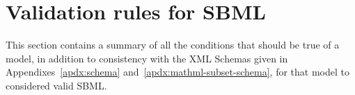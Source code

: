 
\newcommand{\sbmlrule}   [1]{\item[#1.]}

\section{Validation rules for SBML}
\label{apdx:validation-rules}

This section contains a summary of all the conditions that should
be true of a model, in addition to consistency with the XML
Schemas given in Appendixes~\ref{apdx:schema}
and~\ref{apdx:mathml-subset-schema}, for that model to considered
valid SBML.


